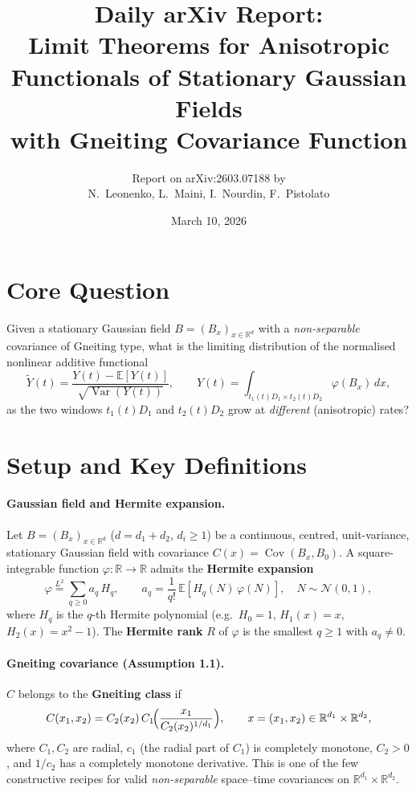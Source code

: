 \documentclass[11pt,a4paper]{article}
\title{Daily arXiv Report:\\[4pt]
\large Limit Theorems for Anisotropic Functionals of Stationary Gaussian Fields\\
with Gneiting Covariance Function}
\author{Report on arXiv:2603.07188 by\\
N.\ Leonenko, L.\ Maini, I.\ Nourdin, F.\ Pistolato}
\date{March 10, 2026}
\begin{document}
\maketitle

\section{Core Question}

Given a stationary Gaussian field $B = (B_x)_{x \in \mathbb{R}^d}$ with a \emph{non-separable} covariance of Gneiting type, what is the limiting distribution of the normalised nonlinear additive functional
\[
\widetilde{Y}(t) = \frac{Y(t) - \mathbb{E}[Y(t)]}{\sqrt{\operatorname{Var}(Y(t))}}, \qquad
Y(t) = \int_{t_1(t)D_1 \times t_2(t)D_2} \varphi(B_x)\,dx,
\]
as the two windows $t_1(t)D_1$ and $t_2(t)D_2$ grow at \emph{different} (anisotropic) rates?

\section{Setup and Key Definitions}

\paragraph{Gaussian field and Hermite expansion.}
Let $B = (B_x)_{x \in \mathbb{R}^d}$ ($d = d_1 + d_2$, $d_i \ge 1$) be a continuous, centred, unit-variance, stationary Gaussian field with covariance $C(x) = \operatorname{Cov}(B_x, B_0)$.
A square-integrable function $\varphi : \mathbb{R} \to \mathbb{R}$ admits the \textbf{Hermite expansion}
\[
\varphi \stackrel{L^2}{=} \sum_{q \ge 0} a_q\, H_q, \qquad
a_q = \frac{1}{q!}\,\mathbb{E}[H_q(N)\,\varphi(N)], \quad N \sim \mathcal{N}(0,1),
\]
where $H_q$ is the $q$-th Hermite polynomial (e.g.\ $H_0 = 1$, $H_1(x) = x$, $H_2(x) = x^2 - 1$).
The \textbf{Hermite rank} $R$ of $\varphi$ is the smallest $q \ge 1$ with $a_q \ne 0$.

\paragraph{Gneiting covariance (Assumption 1.1).}
$C$ belongs to the \textbf{Gneiting class} if
\[
C(x_1, x_2) = C_2(x_2)\,C_1\!\Bigl(\frac{x_1}{C_2(x_2)^{1/d_1}}\Bigr),
\qquad x = (x_1, x_2) \in \mathbb{R}^{d_1} \times \mathbb{R}^{d_2},
\]
where $C_1, C_2$ are radial, $c_1$ (the radial part of $C_1$) is completely monotone, $C_2 > 0$, and $1/c_2$ has a completely monotone derivative.
This is one of the few constructive recipes for valid \emph{non-separable} space--time covariances on $\mathbb{R}^{d_1} \times \mathbb{R}^{d_2}$.
\end{document}
